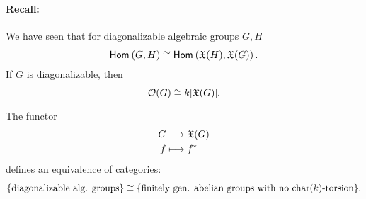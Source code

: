 \paragraph{Recall:} We have seen that for diagonalizable algebraic groups $G,H$
\[ \textsf{Hom}_{}\left(G, H\right) \overset{}{\cong} \textsf{Hom}_{}\left(\mathfrak{X}(H), \mathfrak{X}(G)\right). \]
If $G$ is diagonalizable, then
\[ \mathcal{O}(G) \overset{}{\cong} k[\mathfrak{X}(G)]. \]

\begin{theorem}
The functor
\begin{align*}
G & \overset{}{\longrightarrow} \mathfrak{X}(G)\\
f &\longmapsto f^*
\end{align*}
defines an equivalence of categories:
\[ \{\text{diagonalizable alg. groups}\} \overset{}{\cong} \{ \text{finitely gen. abelian groups with no }\mathrm{char}(k)\text{-torsion} \}. \]
\end{theorem}

